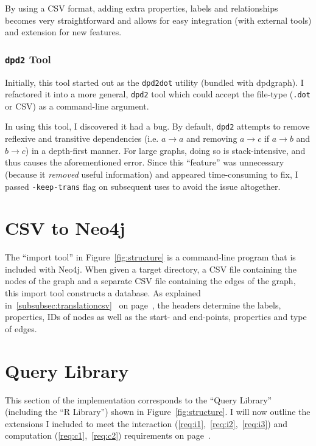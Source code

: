 By using a CSV format, adding extra properties, labels and relationships becomes
very straightforward and allows for easy integration (with external tools) and
extension for new features.

\subsubsection{\texttt{dpd2} Tool}\label{subsubsec:dpd2}

Initially, this tool started out as the \texttt{dpd2dot} utility (bundled with
dpdgraph). I refactored it into a more general, \texttt{dpd2} tool which could
accept the file-type (\texttt{.dot} or CSV) as a command-line argument.

In using this tool, I discovered it had a bug. By default, \texttt{dpd2}
attempts to remove reflexive and transitive dependencies (i.e. $a \rightarrow a$
and removing $a \rightarrow c$ if $a \rightarrow b$ and $b \rightarrow c$) in a
depth-first manner.  For large graphs, doing so is stack-intensive, and thus
causes the aforementioned error.  Since this ``feature'' was unnecessary
(because it \emph{removed} useful information) and appeared time-consuming to
fix, I passed \texttt{-keep-trans} flag on subsequent uses to avoid the issue
altogether.

\section{CSV to Neo4j}

The ``import tool'' in Figure~\ref{fig:structure} is a command-line program
that is included with Neo4j. When given a target directory, a CSV file
containing the nodes of the graph and a separate CSV file containing the edges
of the graph, this import tool constructs a database. As explained
in~\ref{subsubsec:translationcsv}~ on
page~\pageref{subsubsec:translationcsv}, the headers determine the labels,
properties, IDs of nodes as well as the start- and end-points, properties and
type of edges.

\section{Query Library}

This section of the implementation corresponds to the ``Query Library''
(including the ``R Library'') shown in Figure~\ref{fig:structure}. I will now
outline the extensions I included to meet the interaction
(\ref{req:i1},~\ref{req:i2},~\ref{req:i3}) and computation
(\ref{req:c1},~\ref{req:c2}) requirements on page~\pageref{req:i1}.


